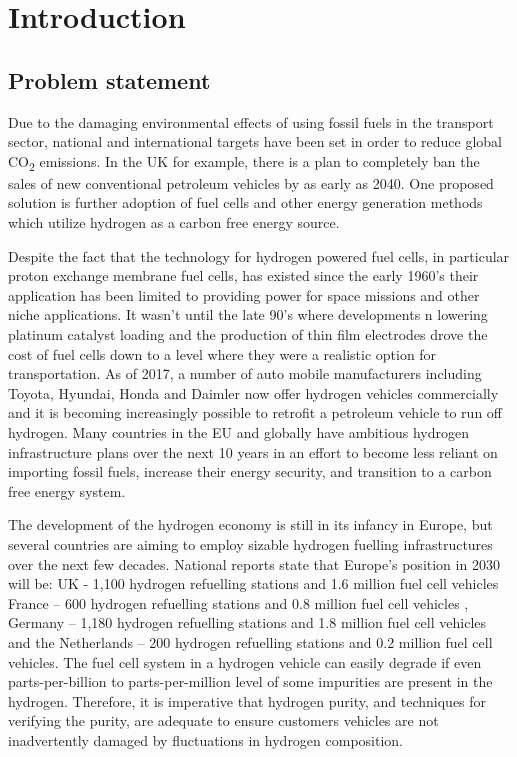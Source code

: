\chapter{Introduction}
\section{Problem statement}
Due to the damaging environmental effects of using fossil fuels in the transport sector, national and 
international targets have been set in order to reduce global CO\textsubscript{2} emissions.
In the UK for example, there is a plan to completely ban the sales of new conventional petroleum vehicles 
by as early as 2040. 
\cite{DepartmentforEnvironment2017} 
One proposed solution is further adoption of fuel cells and other energy generation methods which utilize
hydrogen as a carbon free energy source. 

Despite the fact that the technology for hydrogen powered fuel cells, in particular proton exchange 
membrane fuel cells, has existed since the early 1960’s their application has been limited to providing 
power for space missions and other niche applications. It wasn’t until the late 90’s where developments 
n lowering platinum catalyst loading and the production of thin film electrodes drove the cost of fuel 
cells down to a level where they were a realistic option for transportation. As of 2017, a number of auto 
mobile manufacturers including Toyota,\cite{Toyota2015} Hyundai, \cite{Hyundai2015} Honda \cite{Honda} 
and Daimler \cite{Mohrdieck2014} now offer hydrogen vehicles commercially and it is becoming 
increasingly possible to retrofit a petroleum vehicle to run off hydrogen.\cite{FCell2016} 
Many countries in the EU and globally have ambitious hydrogen infrastructure plans over the next 
10 years in an effort to become less reliant on importing fossil fuels, increase their energy security,
and transition to a carbon free energy system.

The development of the hydrogen economy is still in its infancy in Europe, but several 
countries are aiming to employ sizable hydrogen fuelling infrastructures over the next few decades. 
National reports state that Europe’s position in 2030 will be: UK - 1,100 hydrogen refuelling stations
and 1.6 million fuel cell vehicles \cite{UKH2Mobility2013} France – 600 hydrogen refuelling stations 
and 0.8 million fuel cell vehicles \cite{Summerton2015}, Germany – 1,180 hydrogen refuelling stations 
\cite{Hayter2014} 
and 1.8 million fuel cell vehicles  and the Netherlands – 200 hydrogen refuelling stations and 0.2 
million fuel cell
vehicles. \cite{Hayter2014} The fuel cell system in a hydrogen vehicle can easily degrade if even 
parts-per-billion to parts-per-million level of some impurities are present in the hydrogen. 
Therefore, it is imperative that hydrogen purity, and techniques for verifying the purity, 
are adequate to ensure customers vehicles are not inadvertently damaged by fluctuations in hydrogen 
composition. 

